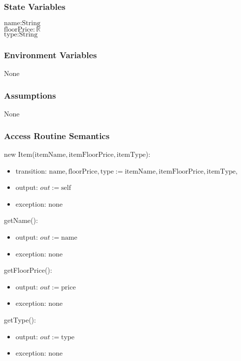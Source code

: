 \documentclass[12pt, titlepage]{article}
\begin{document}
\subsubsection{State Variables}
$\text{name}: \text{String}$\\
$\text{floorPrice}: \text{$\mathbb{R}$}$\\
$\text{type}: \text{String}$

\subsubsection{Environment Variables}
None

\subsubsection{Assumptions}
None

\subsubsection{Access Routine Semantics}

\noindent new Item($\text{itemName}, \text{itemFloorPrice}, \text{itemType}$):
\begin{itemize}
\item transition: $\text{name}, \text{floorPrice}, \text{type}:= \text{itemName}, \text{itemFloorPrice}, \text{itemType},$
\item output: $out := \mbox{self}$
\item exception: none
\end{itemize}


\noindent getName():
\begin{itemize}
\item output: $out := \text{name}$
\item exception: none
\end{itemize}

\noindent getFloorPrice():
\begin{itemize}
\item output: $out := \text{price}$
\item exception: none
\end{itemize}

\noindent getType():
\begin{itemize}
\item output: $out := \text{type}$
\item exception: none
\end{itemize}
\end{document}
